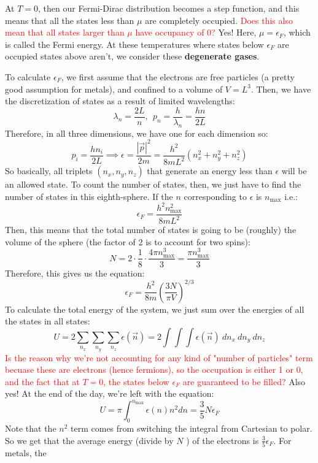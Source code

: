 \documentclass[10pt]{article}
\newcommand{\question}[1]{\textcolor{red}{#1}}
\newcommand{\answer}[1]{\textcolor{green!80!black!}{#1}}
\renewcommand{\comment}[1]{\textcolor{blue!50}{#1}}
\begin{document}
	At \( T = 0 \), then our Fermi-Dirac distribution becomes a step function, and this means that all the states less than
	\( \mu \) are completely occupied. \question{Does this also mean that all states larger than \( \mu \) have occupancy of 
	0?} \answer{Yes!} Here, \( \mu = \epsilon_F \), which is called the Fermi energy. At these temperatures where states below 
	\( \epsilon_F \)  are occupied states above aren't, we consider these \textbf{degenerate gases}.

	To calculate \( \epsilon_F \), we first assume that the electrons are free particles (a pretty good assumption for metals), and 
	confined to a volume of \( V = L^3 \). Then, we have the discretization of states as a result of limited wavelengths:
	\[
	\lambda_n = \frac{2L}{n}, \ \ p_n = \frac{h}{\lambda_n} = \frac{hn}{2L}
	\] 
	Therefore, in all three dimensions, we have one for each dimension so:
	\[
	p_i = \frac{hn_i}{2L} \implies \epsilon = \frac{|\vec p| ^2}{2m} = \frac{h^2}{8mL^2}(n_x^2 + n_y^2 + n_z^2)
	\] 
	So basically, all triplets \( (n_x, n_y, n_z) \) that generate an energy less than \( \epsilon \) will be an allowed 
	state. To count the number of states, then, we just have to find the number of states in this eighth-sphere. If the \( n \) 
	corresponding to \(  \epsilon \) is \( n_{\text{max}} \) i.e.:
	\[
	\epsilon_F = \frac{h^2 n_{\text{max}}^2}{8mL^2}
	\] 
	Then, this means that the total number of states is going to be (roughly) the volume of the sphere (the factor of 
	2 is to account for two spins):
	\[
	N = 2 \cdot \frac{1}{8} \cdot \frac{4\pi n_{\text{max}}^3}{3} = \frac{\pi n_{\text{max}}^3}{3}
	\] 
	Therefore, this gives us the equation:
	\[
	\epsilon_F = \frac{h^2}{8m}\left( \frac{3N}{\pi V} \right) ^{2 /3}
	\] 
	To calculate the total energy of the system, we just sum over the energies of all the states in all states: 
	\[
	U = 2\sum_{n_x}\sum_{n_y}\sum_{n_z} \epsilon(\vec n) = 2 \int \int \int \epsilon(\vec n) \ dn_x \ dn_y \ dn_z
	\] 
	\question{Is the reason why we're not accounting for any kind of "number of particles" term becuase these are electrons
		(hence fermions), so the occupation is either 1 or 0, and the fact that at \( T = 0 \), the states below \( \epsilon_F \) 
	are guaranteed to be filled?} \answer{Also yes!} At the end of the day, we're left with the equation:
	\[
	U = \pi \int_{0}^{n_{\text{max}}} \epsilon(n) n^2 dn = \frac{3}{5}N \epsilon_F 
	\] 
	\comment{Note that the \( n^2 \) term comes from switching the integral from Cartesian to polar.} So we get that the average
	energy (divide by \( N \) ) of the electrons is \( \frac{3}{5}\epsilon_F \). For metals, the 
\end{document}
